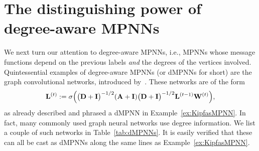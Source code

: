 \section{The distinguishing power of degree-aware MPNNs}\label{sec:dMPNNs}
We next turn our attention to degree-aware MPNNs, i.e., MPNNs whose message functions depend on the previous labels \textit{and} the degrees of the vertices involved.
Quintessential examples of degree-aware MPNNs (or dMPNNs for short) are the graph convolutional networks, introduced by~\cite{kipf-loose}. These networks are of the form
$$
\mathbf{L}^{(t)}:=\sigma\Bigl(\bigl(\mathbf{D}+\mathbf{I}\bigr)^{-1/2} (\mathbf{A}+\mathbf{I})\bigl(\mathbf{D}+\mathbf{I}\bigr)^{-1/2} \mathbf{L}^{(t-1)}\mathbf{W}^{(t)}\Bigr),
$$
as already described and phrased a dMPNN in Example~\ref{ex:KipfasMPNN}. In fact, many commonly used graph neural networks use degree information. We list a couple of such networks in Table~\ref{tab:dMPNNs}. It is easily verified that these can all be cast as dMPNNs along the same lines as Example~\ref{ex:KipfasMPNN}.

